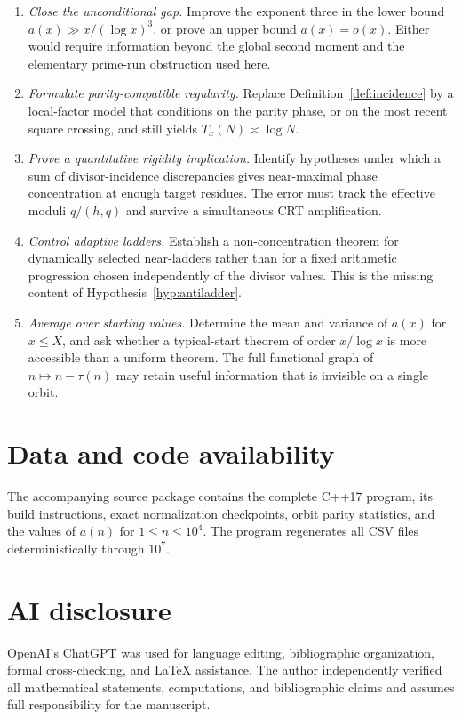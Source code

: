 \documentclass[11pt]{article}
\theoremstyle{definition}
\theoremstyle{remark}
\begin{document}
\begin{enumerate}[label=\textup{\arabic*.},leftmargin=*]
 \item \emph{Close the unconditional gap.}  Improve the exponent three
 in the lower bound $a(x)\gg x/(\log x)^3$, or prove an upper bound
 $a(x)=o(x)$.  Either would require information beyond the global
 second moment and the elementary prime-run obstruction used here.

 \item \emph{Formulate parity-compatible regularity.}  Replace
 Definition~\ref{def:incidence} by a local-factor model that conditions
 on the parity phase, or on the most recent square crossing, and still
 yields $T_x(N)\asymp\log N$.

 \item \emph{Prove a quantitative rigidity implication.}  Identify
 hypotheses under which a sum of divisor-incidence discrepancies gives
 near-maximal phase concentration at enough target residues.  The error
 must track the effective moduli $q/(h,q)$ and survive a simultaneous
 CRT amplification.

 \item \emph{Control adaptive ladders.}  Establish a non-concentration
 theorem for dynamically selected near-ladders rather than for a fixed
 arithmetic progression chosen independently of the divisor values.
 This is the missing content of Hypothesis~\ref{hyp:antiladder}.

 \item \emph{Average over starting values.}  Determine the mean and
 variance of $a(x)$ for $x\leq X$, and ask whether a typical-start
 theorem of order $x/\log x$ is more accessible than a uniform theorem.
 The full functional graph of $n\mapsto n-\tau(n)$ may retain useful
 information that is invisible on a single orbit.
\end{enumerate}

\section*{Data and code availability}

The accompanying source package contains the complete C++17 program,
its build instructions, exact normalization checkpoints, orbit parity
statistics, and the values of $a(n)$ for $1\leq n\leq10^4$.  The
program regenerates all CSV files deterministically through $10^7$.

\section*{AI disclosure}

OpenAI's ChatGPT was used for language editing, bibliographic
organization, formal cross-checking, and \LaTeX{} assistance.  The
author independently verified all mathematical statements,
computations, and bibliographic claims and assumes full responsibility
for the manuscript.

\printbibliography
\end{document}

